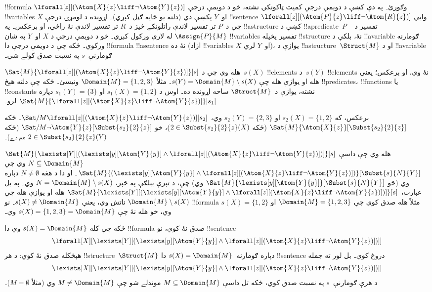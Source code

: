 \documentclass[../../../include/open-logic-section]{subfiles}
\begin{document}
\begin{ex}
  !!{formula} $\lforall[z][(\Atom{X}{z} \liff \lnot
    \Atom{Y}{z})]$ وګورئ۔ په دې کښې د دويمې درجې کميت ټاکونکي
  نشته، خو د دويمې درجې !!{variable}s $X$ او~$Y$ پکښې دي (دلته
  يو ځايه ګڼل کېږي)۔ اړونده د لومړۍ درجې !!{sentence}
  $\lforall[z][(\Atom{P}{z} \liff \lnot \Atom{R}{z})]$ وايي چې د~$P$
  تر تفسير لاندې راتلونکے څيز د~$R$ تر تفسير لاندې نۀ راځي، او
  برعکس۔ په !!a{structure} کښې د !!a{predicate}~$P$ تفسير د
  ~$\Assign{P}{M}$ له لارې ورکول کېږي۔ خو د دويمې درجې د $X$ او~$Y$
  په شان !!{variable}s تفسير پخپله !!{structure} نۀ، بلکې د
  !!a{variable} ګومارنه ورکوي۔ ځکه چې د دويمې درجې دا !!{formula}
  !!a{sentence} نۀ ده (ازاد !!{variable}s $X$ او~$Y$ لري)، يوازې
  د !!a{structure}~$\Struct{M}$ او د !!a{variable} ګومارنې~$s$ په
  نسبت صدق کولے شي۔

  $\Sat{M}{\lforall[z][(\Atom{X}{z} \liff \lnot \Atom{Y}{z})]}[s]$
  هله وي چې د~$s(X)$ !!{element}s د~$s(Y)$ !!{element}s نۀ وي،
  او برعکس؛ يعنې هله او يوازې هله چې
  $s(Y) = \Domain{M} \setminus s(X)$۔ مثلاً $\Domain{M} = \{1, 2, 3\}$
  ونيسئ۔ ځکه چې دلته هېڅ !!{predicate}s، !!{function}s يا
  !!{constant}s نشته، يوازې د~$\Struct{M}$ ساحه اړونده ده۔ اوس
  د $s_1(X) = \{1, 2\}$ او $s_1(Y) = \{3\}$ دپاره
  $\Sat{M}{\lforall[z][(\Atom{X}{z}
      \liff \lnot \Atom{Y}{z})]}[s_1]$ لرو۔

  برعکس، که $s_2(X) = \{1, 2\}$ او $s_2(Y) = \{2, 3\}$ وي،
  $\Sat/{M}{\lforall[z][(\Atom{X}{z} \liff \lnot
      \Atom{Y}{z})]}[s_2]$۔ ځکه
  $\Sat{M}{\Atom{X}{z}}[\Subst{s_2}{2}{z}]$ (ځکه $2 \in \Subst{s_2}{2}{z}(X)$)،
  خو $\Sat/{M}{\lnot \Atom{Y}{z}}[\Subst{s_2}{2}{z}]$ (ځکه $2 \in
  \Subst{s_2}{2}{z}(Y)$ هم دے)۔
\end{ex}

\begin{ex}
  $\Sat{M}{\lexists[Y][(\lexists[y][\Atom{Y}{y}] \land
  \lforall[z][(\Atom{X}{z} \liff \lnot \Atom{Y}{z})])]}[s]$ هله
  وي چې داسې $N \subseteq \Domain{M}$ وي چې
  $\Sat{M}{(\lexists[y][\Atom{Y}{y}] \land \lforall[z][(\Atom{X}{z}
  \liff \lnot \Atom{Y}{z})])}[\Subst{s}{N}{Y}]$۔ او دا د هغه
  $N \neq \emptyset$ دپاره وي (څو
  $\Sat{M}{\lexists[y][\Atom{Y}{y}]}[\Subst{s}{N}{Y}]$ وي) چې، د
  تېرې بېلګې په څېر، $N = \Domain{M} \setminus s(X)$ وي۔ په بل
  عبارت، $\Sat{M}{\lexists[Y][(\lexists[y][\Atom{Y}{y}] \land
  \lforall[z][(\Atom{X}{z} \liff \lnot \Atom{Y}{z})])]}[s]$
  هله او يوازې هله چې $\Domain{M} \setminus s(X)$ ناتش وي، يعنې
  $s(X) \neq \Domain{M}$۔ نو !!{formula} مثلاً هله صدق کوي چې
  $\Domain{M} = \{1, 2, 3\}$ او $s(X) = \{1, 2\}$ وي، خو هله
  نۀ چې $s(X) = \{1, 2, 3\} = \Domain{M}$ وي۔

  ځکه چې کله $s(X) = \Domain{M}$ وي دا !!{formula} صدق نۀ کوي،
  نو !!{sentence}
  \[
  \lforall[X][\lexists[Y][(\lexists[y][\Atom{Y}{y}] \land
      \lforall[z][(\Atom{X}{z} \liff \lnot \Atom{Y}{z})])]]
  \]
  هېڅکله صدق نۀ کوي: د هر !!{structure}~$\Struct{M}$ دپاره
  ګومارنه~$s(X) = \Domain{M}$ دا !!{sentence} دروغ کوي۔ بل لور ته
  جمله
  \[
  \lexists[X][\lexists[Y][(\lexists[y][\Atom{Y}{y}] \land
      \lforall[z][(\Atom{X}{z} \liff \lnot \Atom{Y}{z})])]]
  \]
  د هرې ګومارنې~$s$ په نسبت صدق کوي، ځکه تل داسې
  $M \subseteq \Domain{M}$ موندلے شو چې $M \neq \Domain{M}$ وي
  (مثلاً $M = \emptyset$)۔
\end{ex}
\end{document}
